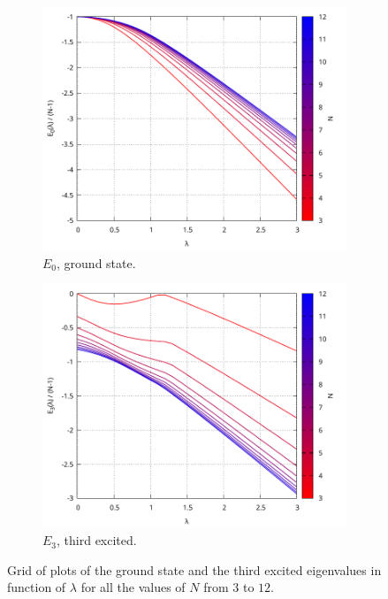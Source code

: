 \documentclass[11pt,a4paper]{article}
\begin{document}
\begin{figure}
	\centering
	\begin{subfigure}{0.49\textwidth}
		\includegraphics[width=1\linewidth]{Plots/EigVals_k00.pdf}
		\caption{$E_0$, ground state.}
		\label{fig:k0}
	\end{subfigure}%
	\hfill
	\begin{subfigure}{0.49\textwidth}
		\includegraphics[width=1\linewidth]{Plots/EigVals_k03.pdf}
		\caption{$E_3$, third excited.}
		\label{fig:k3}
	\end{subfigure}
	\caption{Grid of plots of the ground state and the third excited eigenvalues in function of $\lambda$ for all the values of $N$ from $3$ to $12$.}
	\label{fig:plotsk}
\end{figure}
\end{document}
